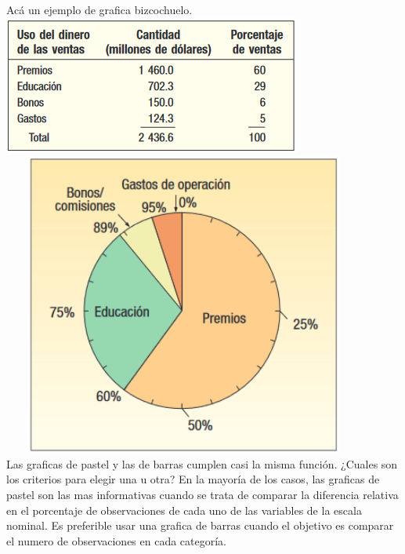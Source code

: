 \documentclass[]{article}
\begin{document}
Acá un ejemplo de grafica bizcochuelo.\\
\includegraphics{imagenes/tablaFrecuenciasRelativas2_2.PNG}\\
\includegraphics[width=12cm, height=10cm]{imagenes/graficoPastel2_2.png} \\
Las graficas de pastel y las de barras cumplen casi la misma función. ¿Cuales son los criterios para elegir una u otra? En la mayoría de los casos, las graficas de pastel son las mas informativas cuando se trata de comparar la diferencia relativa en el porcentaje de observaciones de cada uno de las variables de la escala nominal. Es preferible usar una grafica de barras cuando el objetivo es comparar el numero de observaciones en cada categoría.
\end{document}
